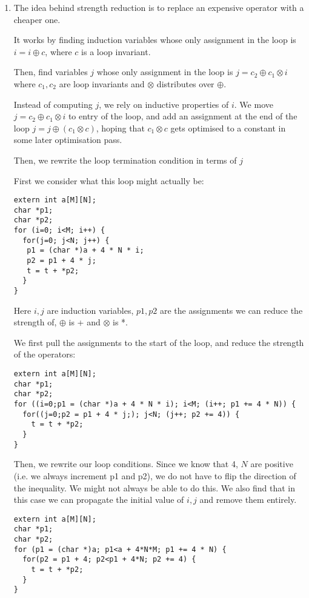 


\begin{enumerate}[label=(\alph*)]
  \item
    The idea behind strength reduction is to replace an expensive operator with a cheaper one.

    It works by finding induction variables whose only assignment in the loop is $i = i \oplus c$, where $c$ is a loop invariant.

    Then, find variables $j$ whose only assignment in the loop is $j = c_2 \oplus c_1 \otimes i$ where $c_1,c_2$ are loop invariants and $\otimes$ distributes over $\oplus$.

    Instead of computing $j$, we rely on inductive properties of $i$. We move $j = c_2 \oplus c_1 \otimes i$ to entry of the loop, and add an assignment at the end of the loop $j = j \oplus (c_1 \otimes c)$, hoping that $c_1 \otimes c$ gets optimised to a constant in some later optimisation pass.

    Then, we rewrite the loop termination condition in terms of $j$

    First we consider what this loop might actually be:

\begin{verbatim}
extern int a[M][N];
char *p1;
char *p2;
for (i=0; i<M; i++) {
  for(j=0; j<N; j++) {
   p1 = (char *)a + 4 * N * i;
   p2 = p1 + 4 * j;
   t = t + *p2;
  }
}
\end{verbatim}


Here $i,j$ are induction variables, $p1, p2$ are the assignments we can reduce the strength of, $\oplus$ is + and $\otimes$ is *.

We first pull the assignments to the start of the loop, and reduce the strength of the operators:

\begin{verbatim}
extern int a[M][N];
char *p1;
char *p2;
for ((i=0;p1 = (char *)a + 4 * N * i); i<M; (i++; p1 += 4 * N)) {
  for((j=0;p2 = p1 + 4 * j;); j<N; (j++; p2 += 4)) {
    t = t + *p2;
  }
}
\end{verbatim}

Then, we rewrite our loop conditions. Since we know that  4, $N$ are positive (i.e. we always increment p1 and p2), we do not have to flip the direction of the inequality. We might not always be able to do this. We also find that in this case we can propagate the initial value of $i,j$ and remove them entirely.

\begin{verbatim}
extern int a[M][N];
char *p1;
char *p2;
for (p1 = (char *)a; p1<a + 4*N*M; p1 += 4 * N) {
  for(p2 = p1 + 4; p2<p1 + 4*N; p2 += 4) {
    t = t + *p2;
  }
}
\end{verbatim}


\end{enumerate}
